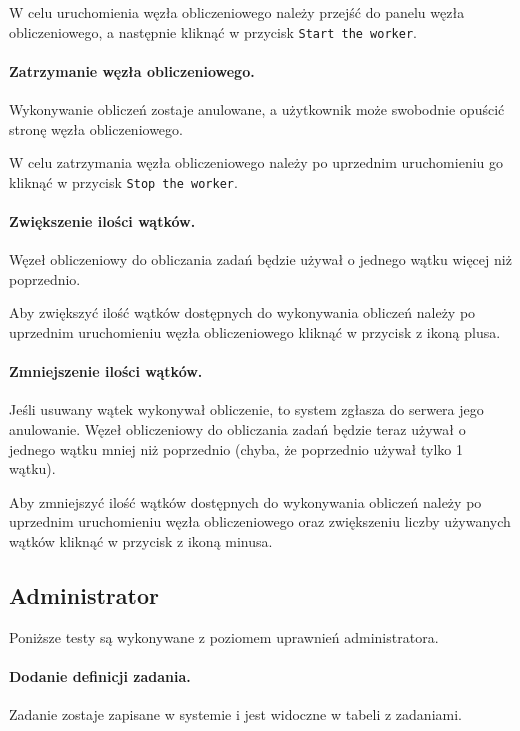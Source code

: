 \documentclass[a4paper,11pt,twoside]{report}
\theoremstyle{definition}
\begin{document}
                W celu uruchomienia węzła obliczeniowego należy przejść do panelu węzła obliczeniowego, a następnie kliknąć w przycisk \texttt{Start the worker}. 
                
            \paragraph{Zatrzymanie węzła obliczeniowego.}  
                \noindent Wykonywanie obliczeń zostaje anulowane, a użytkownik może swobodnie opuścić stronę węzła obliczeniowego.
    
                W celu zatrzymania węzła obliczeniowego należy po uprzednim uruchomieniu go kliknąć w przycisk \texttt{Stop the worker}.
                
            \paragraph{Zwiększenie ilości wątków.}   
                \noindent Węzeł obliczeniowy do obliczania zadań będzie używał o jednego wątku więcej niż poprzednio. 

                Aby zwiększyć ilość wątków dostępnych do wykonywania obliczeń należy po uprzednim uruchomieniu węzła obliczeniowego kliknąć w przycisk z ikoną plusa.

            \paragraph{Zmniejszenie ilości wątków.}   
                \noindent Jeśli usuwany wątek wykonywał obliczenie, to system zgłasza do serwera jego anulowanie. Węzeł obliczeniowy do obliczania zadań będzie teraz używał o jednego wątku mniej niż poprzednio (chyba, że poprzednio używał tylko 1 wątku).

                Aby zmniejszyć ilość wątków dostępnych do wykonywania obliczeń należy po uprzednim uruchomieniu węzła obliczeniowego oraz zwiększeniu liczby używanych wątków kliknąć w przycisk z ikoną minusa.

        \subsection{Administrator}
            Poniższe testy są wykonywane z poziomem uprawnień administratora.

            \paragraph{Dodanie definicji zadania.}   
                \noindent Zadanie zostaje zapisane w systemie i jest widoczne w tabeli z zadaniami. 
\end{document}
